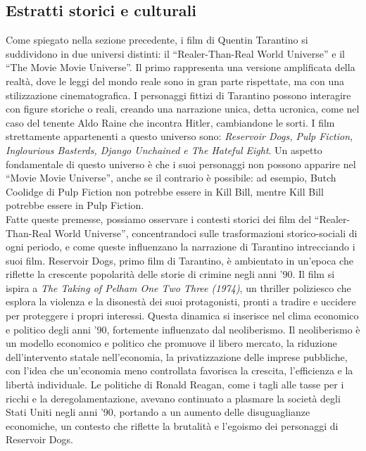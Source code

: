 \documentclass[12pt]{article} %
\begin{document}
\subsection{Estratti storici e culturali}
\begin{flushleft}
    Come spiegato nella sezione precedente, i film di Quentin Tarantino si suddividono in due universi distinti: il “Realer-Than-Real World Universe” e il “The Movie Movie Universe”.
    Il primo rappresenta una versione amplificata della realtà, dove le leggi del mondo reale sono in gran parte rispettate, ma con una stilizzazione cinematografica. I personaggi fittizi di Tarantino possono interagire con figure storiche o reali, creando una narrazione unica, detta ucronica, come nel caso del tenente Aldo Raine che incontra Hitler, cambiandone le sorti. I film strettamente appartenenti a questo universo sono: \textit{Reservoir Dogs, Pulp Fiction, Inglourious Basterds, Django Unchained e The Hateful Eight}. Un aspetto fondamentale di questo universo è che i suoi personaggi non possono apparire nel “Movie Movie Universe”, anche se il contrario è possibile: ad esempio, Butch Coolidge di Pulp Fiction non potrebbe essere in Kill Bill, mentre Kill Bill potrebbe essere in Pulp Fiction.\\\vspace{1cm}
    Fatte queste premesse, possiamo osservare i contesti storici dei film del “Realer-Than-Real World Universe”, concentrandoci sulle trasformazioni storico-sociali di ogni periodo, e come queste influenzano la narrazione di Tarantino intrecciando i suoi film.
    Reservoir Dogs, primo film di Tarantino, è ambientato in un'epoca che riflette la crescente popolarità delle storie di crimine negli anni '90. Il film si ispira a \textit{The Taking of Pelham One Two Three (1974)}, un thriller poliziesco che esplora la violenza e la disonestà dei suoi protagonisti, pronti a tradire e uccidere per proteggere i propri interessi. Questa dinamica si inserisce nel clima economico e politico degli anni '90, fortemente influenzato dal neoliberismo. Il neoliberismo è un modello economico e politico che promuove il libero mercato, la riduzione dell'intervento statale nell'economia, la privatizzazione delle imprese pubbliche, con l'idea che un'economia meno controllata favorisca la crescita, l'efficienza e la libertà individuale. Le politiche di Ronald Reagan, come i tagli alle tasse per i ricchi e la deregolamentazione, avevano continuato a plasmare la società degli Stati Uniti negli anni '90, portando a un aumento delle disuguaglianze economiche, un contesto che riflette la brutalità e l'egoismo dei personaggi di Reservoir Dogs.

\end{flushleft}
\end{document}
